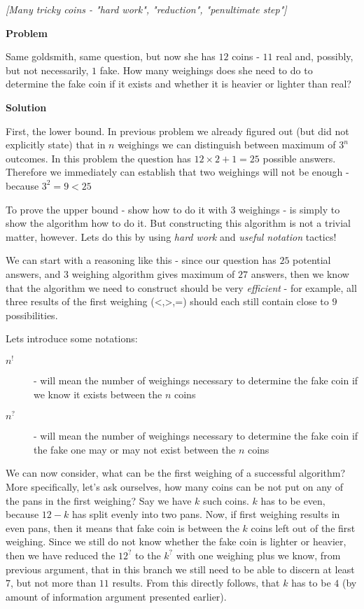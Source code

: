 \begin{problem}
\textit{[Many tricky coins - "hard work", "reduction", "penultimate step"]}

\textbf{Problem}

Same goldsmith, same question, but now she has $12$ coins - $11$ real and, possibly, but not necessarily, $1$ fake.
How many weighings does she need to do to determine the fake coin if it exists and whether it is heavier or lighter than real? 

\textbf{Solution}

First, the lower bound. In previous problem we already figured out (but did not explicitly state) that in $n$ weighings we can distinguish between maximum of $3^n$ outcomes. In this problem the question has $12\times 2 +1 = 25$ possible answers. Therefore we immediately can establish that two weighings will not be enough - because $3^2=9 <25$

To prove the upper bound - show how to do it with $3$ weighings - is simply to show the algorithm how to do it. But constructing this algorithm is not a trivial matter, however. Lets do this by using \textit{hard work} and \textit{useful notation} tactics! 

We can start with a reasoning like this - since our question has $25$ potential answers, and $3$ weighing algorithm gives maximum of $27$ answers, then we know that the algorithm we need to construct should be very \textit{efficient} - for example, all three results of the first weighing (<,>,=) should each still contain close to $9$ possibilities.  

Lets introduce some notations:
\begin{description}
\item[$n^!$] - will mean the number of weighings necessary to determine the fake coin if we know it exists between the $n$ coins
\item[$n^?$] - will mean the number of weighings necessary to determine the fake coin if the fake one may or may not exist between the $n$ coins
\end{description}

We can now consider, what can be the first weighing of a successful algorithm? More specifically, let's ask ourselves, how many coins can be not put on any of the pans in the first weighing? Say we have $k$ such coins. $k$ has to be even, because $12-k$ has split evenly into two pans.  
Now, if first weighing results in even pans, then it means that fake coin is between the $k$ coins left out of the first weighing. Since we still do not know whether the fake coin is lighter or heavier, then we have 
	reduced the $12^?$ to the $k^?$ with one weighing plus we know, from previous argument, that in this branch we still need to be able to discern at least $7$, but not more than $11$ results. From this directly follows, that $k$ has to be $4$ (by amount of information argument presented earlier).
	

\end{problem}
